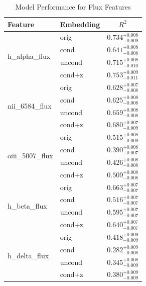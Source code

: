 \begin{table}[htbp]
\centering
\caption{Model Performance for Flux Features}
\label{tab:flux_results}
\begin{tabular}{llc}
\toprule
\textbf{Feature} & \textbf{Embedding} & \textbf{$R^2$} \\
\midrule
\multirow{4}{*}{h\_alpha\_flux} & orig & $0.734^{+0.008}_{-0.009}$ \\
 & cond & $0.641^{+0.008}_{-0.008}$ \\
 & uncond & $0.715^{+0.008}_{-0.010}$ \\
 & cond+z & $0.753^{+0.009}_{-0.011}$ \\
\midrule
\multirow{4}{*}{nii\_6584\_flux} & orig & $0.628^{+0.007}_{-0.008}$ \\
 & cond & $0.625^{+0.008}_{-0.008}$ \\
 & uncond & $0.659^{+0.008}_{-0.008}$ \\
 & cond+z & $0.680^{+0.007}_{-0.009}$ \\
\midrule
\multirow{4}{*}{oiii\_5007\_flux} & orig & $0.515^{+0.008}_{-0.009}$ \\
 & cond & $0.390^{+0.008}_{-0.007}$ \\
 & uncond & $0.426^{+0.008}_{-0.008}$ \\
 & cond+z & $0.509^{+0.008}_{-0.008}$ \\
\midrule
\multirow{4}{*}{h\_beta\_flux} & orig & $0.663^{+0.007}_{-0.007}$ \\
 & cond & $0.516^{+0.007}_{-0.007}$ \\
 & uncond & $0.595^{+0.007}_{-0.007}$ \\
 & cond+z & $0.640^{+0.007}_{-0.007}$ \\
\midrule
\multirow{4}{*}{h\_delta\_flux} & orig & $0.418^{+0.009}_{-0.009}$ \\
 & cond & $0.282^{+0.009}_{-0.008}$ \\
 & uncond & $0.345^{+0.008}_{-0.009}$ \\
 & cond+z & $0.380^{+0.009}_{-0.009}$ \\
\bottomrule
\end{tabular}
\end{table}


